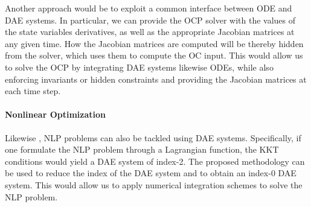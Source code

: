 Another approach would be to exploit a common interface between \ac{ODE} and \ac{DAE} systems. In particular, we can provide the \ac{OCP} solver with the values of the state variables derivatives, as well as the appropriate Jacobian matrices at any given time. How the Jacobian matrices are computed will be thereby hidden from the solver, which uses them to compute the \ac{OC} input. This would allow us to solve the \ac{OCP} by integrating \ac{DAE} systems likewise \acp{ODE}, while also enforcing invariants or hidden constraints and providing the Jacobian matrices at each time step.

\paragraph{Nonlinear Optimization}

Likewise \citet{shmoylova2013simplification}, \ac{NLP} problems can also be tackled using \ac{DAE} systems. Specifically, if one formulate the \ac{NLP} problem through a Lagrangian function, the \ac{KKT} conditions would yield a \ac{DAE} system of index-2. The proposed methodology can be used to reduce the index of the \ac{DAE} system and to obtain an index-0 \ac{DAE} system. This would allow us to apply numerical integration schemes to solve the \ac{NLP} problem.
